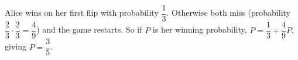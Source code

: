 Alice wins on her first flip with probability $\dfrac13$. Otherwise both miss (probability $\dfrac23\cdot\dfrac23=\dfrac49$) and the game restarts. So if $P$ is her winning probability, $P=\dfrac13+\dfrac49P$, giving $P=\boxed{\dfrac35}$.
